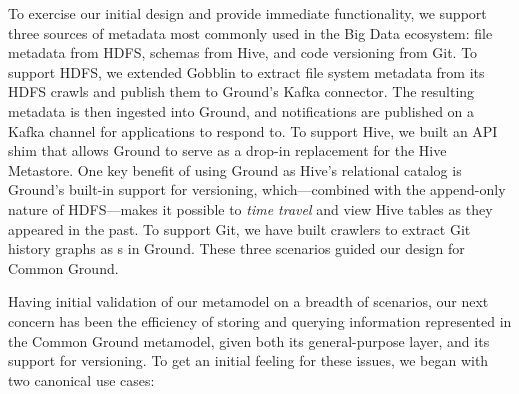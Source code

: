 \documentclass{sig-alternate}
\begin{document}





To exercise our initial design and provide immediate functionality,
we 
support three sources of metadata most commonly used in the Big Data ecosystem: file metadata from HDFS, schemas from Hive, and code versioning from Git.
To support HDFS, we extended Gobblin to extract file system metadata from its HDFS crawls and publish them to Ground's Kafka connector. The resulting metadata is then ingested into Ground, and notifications are published on a Kafka channel for applications to respond to. To support Hive, we built an API shim that allows Ground to serve as a drop-in replacement for the Hive Metastore.
One key benefit of using Ground as Hive's relational catalog is Ground's built-in support for versioning, which---combined with the append-only nature of HDFS---makes it possible to \emph{time travel} and view Hive tables as they appeared in the past.  To support Git, we have built crawlers to extract Git history graphs as s in Ground. These three scenarios guided our design for Common Ground.

Having initial validation of our metamodel on a breadth of scenarios, our next concern has been the efficiency of storing and querying information represented in the Common Ground metamodel, given both its general-purpose \mantle layer, and its support for versioning. To get an initial feeling for these issues, we began with two canonical use cases:
\end{document}
